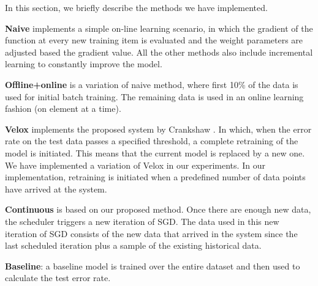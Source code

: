 \documentclass{sig-alternate-05-2015}
\begin{document}
In this section, we briefly describe the methods we have implemented.

\textbf{Naive} implements a simple on-line learning scenario, in which the gradient of the function at every new training item is evaluated and the weight parameters are adjusted based the gradient value. 
All the other methods also include incremental learning to constantly improve the model.

\textbf{Offline+online} is a variation of naive method, where first 10\% of the data is used for initial batch training.
The remaining data is used in an online learning fashion (on element at a time). 

\textbf{Velox} implements the proposed system by Crankshaw \cite{crankshaw2014missing}. 
In which, when the error rate on the test data passes a specified threshold, a complete retraining of the model is initiated. 
This means that the current model is replaced by a new one. 
We have implemented a variation of Velox in our experiments. 
In our implementation, retraining is initiated when a predefined number of data points have arrived at the system. 

\textbf{Continuous} is based on our proposed method. 
Once there are enough new data, the scheduler triggers a new iteration of SGD. 
The data used in this new iteration of SGD consists of the new data that arrived in the system since the last scheduled iteration plus a sample of the existing historical data.

\textbf{Baseline}: a baseline model is trained over the entire dataset and then used to calculate the test error rate. 
\end{document}

